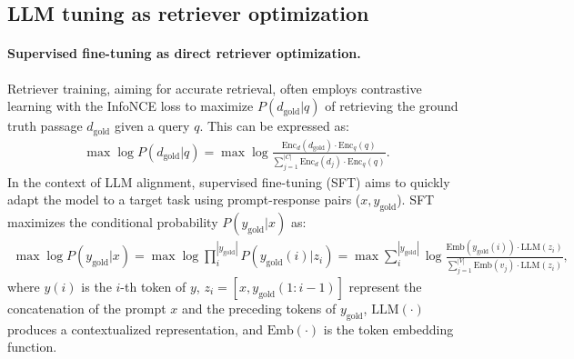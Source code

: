 \subsection{LLM tuning as retriever optimization}\label{sec:llm-tuning-retriever}

\paragraph{Supervised fine-tuning as direct retriever optimization.}
Retriever training, aiming for accurate retrieval, often employs contrastive learning with the InfoNCE loss \citep{oord2018representation} to maximize $P(d_{\text{gold}}|q)$ of retrieving the ground truth passage $d_{\text{gold}}$ given a query $q$. This can be expressed as:
\begin{gather*}
    \max \log P(d_{\text{gold}}|q) = \max \log \frac{\text{Enc}_d(d_{\text{gold}}) \cdot\text{Enc}_q(q)}{\sum^{|C|}_{j=1} \text{Enc}_d(d_j) \cdot\text{Enc}_q(q)}.
\end{gather*}
In the context of LLM alignment, supervised fine-tuning (SFT) aims to quickly adapt the model to a target task using prompt-response pairs ($x, y_{\text{gold}}$). 
SFT maximizes the conditional probability $P(y_{\text{gold}}|x)$ as:
\begin{gather*}
    \max \log P(y_{\text{gold}}|x) = \max \log \prod^{|y_{\text{gold}}|}_i P(y_{\text{gold}}(i)|z_i) 
    = \max \sum^{|y_{\text{gold}}|}_i \log \frac{\text{Emb}(y_{\text{gold}}(i)) \cdot\text{LLM}(z_i)}{\sum^{|V|}_{j=1} \text{Emb}(v_j) \cdot\text{LLM}(z_i)},
\end{gather*}
where $y(i)$ is the $i$-th token of $y$, $z_i=[x, y_{\text{gold}}(1:i-1)]$ represent the concatenation of the prompt $x$ and the preceding tokens of $y_{\text{gold}}$, $\text{LLM}(\cdot)$ produces a contextualized representation, and $\text{Emb}(\cdot)$ is the token embedding function.

